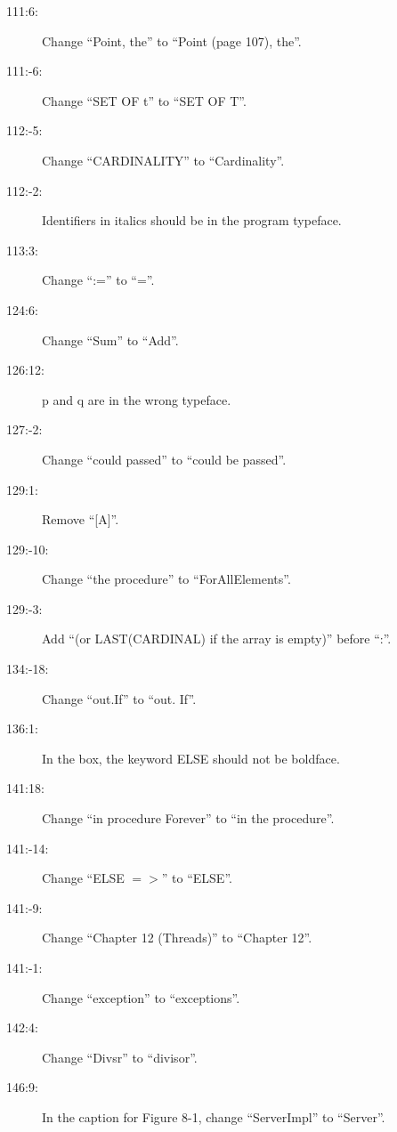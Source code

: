 \begin{description}
\item[111:6:] Change ``{\sf Point}, the'' to ``{\sf Point} (page 107), the''.

\item[111:-6:] Change ``{\sf SET OF t}'' to ``{\sf SET OF T}''.

\item[112:-5:] Change ``{\sf CARDINALITY}'' to ``{\sf Cardinality}''.

\item[112:-2:] Identifiers in italics should be in the program typeface.

\item[113:3:] Change ``:='' to ``=''.

\item[124:6:] Change ``{\sf Sum}'' to ``{\sf Add}''.

\item[126:12:] {\sf p} and {\sf q} are in the wrong typeface.

\item[127:-2:] Change ``could passed'' to ``could be passed''.

\item[129:1:] Remove ``[A]''.

\item[129:-10:] Change ``the procedure'' to ``{\sf ForAllElements}''.

\item[129:-3:] Add ``(or {\sf LAST(CARDINAL)}
if the array is empty)'' before ``:''.

\item[134:-18:] Change ``out.If'' to ``out. If''.

\item[136:1:] In the box, the keyword {\sf ELSE} should not be boldface.

\item[141:18:] Change ``in procedure {\sf Forever}'' to ``in the procedure''.

\item[141:-14:] Change ``{\sf ELSE} $=>$'' to ``{\sf ELSE}''.

\item[141:-9:] Change ``Chapter 12 (Threads)'' to ``Chapter 12''.

\item[141:-1:] Change ``exception'' to ``exceptions''.

\item[142:4:] Change ``{\sf Divsr}'' to ``{\sf divisor}''.

\item[146:9:] In the caption for Figure 8-1, change ``{\sf ServerImpl}''
to ``{\sf Server}''.


\end{description}
